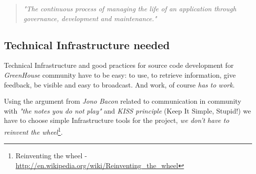 \documentclass[11pt]{scrartcl}
\begin{document}
\begin{quotation}
    \emph{"The continuous process of managing the life of an application through governance, development and maintenance."}
\end{quotation}

\subsection{Technical Infrastructure needed}
\label{sub:infrastructure}

\par Technical Infrastructure and good practices for source code development for \emph{GreenHouse} community have to be easy: to use, to retrieve information, give feedback, be visible and easy to broadcast. And work, of course \emph{has to work}.

\par Using the argument from \emph{Jono Bacon} related to communication in community with \emph{"the notes you do not play"} and \emph{KISS principle} (Keep It Simple, Stupid!\cite{kiss}) we have to choose simple Infrastructure tools for the project, \emph{we don't have to reinvent the wheel}\footnote{Reinventing the wheel - \url{http://en.wikipedia.org/wiki/Reinventing_the_wheel}}.
\end{document}
